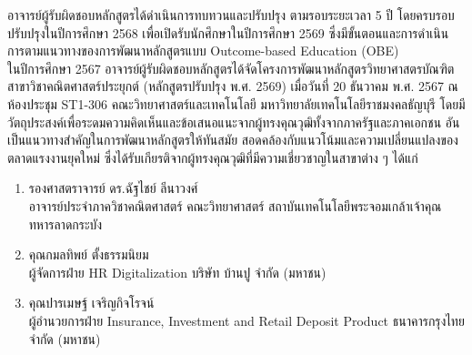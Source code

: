 อาจารย์ผู้รับผิดชอบหลักสูตรได้ดำเนินการทบทวนและปรับปรุง\printprogram{} ตามรอบระยะเวลา 5 ปี โดยครบรอบปรับปรุงในปีการศึกษา 2568 เพื่อเปิดรับนักศึกษาในปีการศึกษา 2569 ซึ่งมีขั้นตอนและการดำเนินการตามแนวทางของการพัฒนาหลักสูตรแบบ Outcome-based Education (OBE) \\
%
\indent ในปีการศึกษา 2567 อาจารย์ผู้รับผิดชอบหลักสูตรได้จัดโครงการพัฒนาหลักสูตรวิทยาศาสตรบัณฑิต สาขาวิชาคณิตศาสตร์ประยุกต์ (หลักสูตรปรับปรุง พ.ศ. 2569) เมื่อวันที่ 20 ธันวาคม พ.ศ. 2567 ณ ห้องประชุม ST1-306 คณะวิทยาศาสตร์และเทคโนโลยี มหาวิทยาลัยเทคโนโลยีราชมงคลธัญบุรี โดยมีวัตถุประสงค์เพื่อระดมความคิดเห็นและข้อเสนอแนะจากผู้ทรงคุณวุฒิทั้งจากภาครัฐและภาคเอกชน อันเป็นแนวทางสำคัญในการพัฒนาหลักสูตรให้ทันสมัย สอดคล้องกับแนวโน้มและความเปลี่ยนแปลงของตลาดแรงงานยุคใหม่ ซึ่งได้รับเกียรติจากผู้ทรงคุณวุฒิที่มีความเชี่ยวชาญในสาขาต่าง ๆ ได้แก่ 
\begin{enumerate}
	\item รองศาสตราจารย์ ดร.ฉัฐไชย์ ลีนาวงศ์ 
	\\อาจารย์ประจำภาควิชาคณิตศาสตร์ คณะวิทยาศาสตร์ สถาบันเทคโนโลยีพระจอมเกล้าเจ้าคุณทหารลาดกระบัง %
	\item คุณกมลทิพย์ ตั้งธรรมนิยม \\ผู้จัดการฝ่าย HR Digitalization บริษัท บ้านปู จำกัด (มหาชน) %
	\item คุณปารเมษฐ์ เจริญกิจโรจน์ \\ผู้อำนวยการฝ่าย Insurance, Investment and Retail Deposit Product ธนาคารกรุงไทย จำกัด (มหาชน) %
\end{enumerate}
